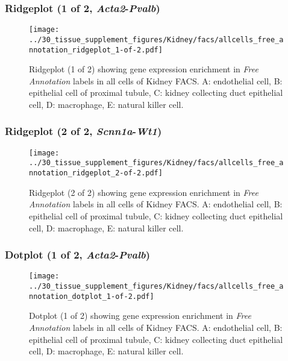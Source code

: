 \clearpage

\subsubsection{Ridgeplot (1 of 2, \emph{Acta2}-\emph{Pvalb})}
\begin{figure}[h]
\centering
\texttt{[image: ../30\_tissue\_supplement\_figures/Kidney/facs/allcells\_free\_annotation\_ridgeplot\_1-of-2.pdf]}

\caption{ Ridgeplot (1 of 2)  showing gene expression enrichment in \emph{Free Annotation} labels in all cells of Kidney FACS. A: endothelial cell, B: epithelial cell of proximal tubule, C: kidney collecting duct epithelial cell, D: macrophage, E: natural killer cell.}
\end{figure}


\clearpage

\subsubsection{Ridgeplot (2 of 2, \emph{Scnn1a}-\emph{Wt1})}
\begin{figure}[h]
\centering
\texttt{[image: ../30\_tissue\_supplement\_figures/Kidney/facs/allcells\_free\_annotation\_ridgeplot\_2-of-2.pdf]}

\caption{ Ridgeplot (2 of 2)  showing gene expression enrichment in \emph{Free Annotation} labels in all cells of Kidney FACS. A: endothelial cell, B: epithelial cell of proximal tubule, C: kidney collecting duct epithelial cell, D: macrophage, E: natural killer cell.}
\end{figure}


\clearpage

\subsubsection{Dotplot (1 of 2, \emph{Acta2}-\emph{Pvalb})}
\begin{figure}[h]
\centering
\texttt{[image: ../30\_tissue\_supplement\_figures/Kidney/facs/allcells\_free\_annotation\_dotplot\_1-of-2.pdf]}

\caption{ Dotplot (1 of 2)  showing gene expression enrichment in \emph{Free Annotation} labels in all cells of Kidney FACS. A: endothelial cell, B: epithelial cell of proximal tubule, C: kidney collecting duct epithelial cell, D: macrophage, E: natural killer cell.}
\end{figure}


